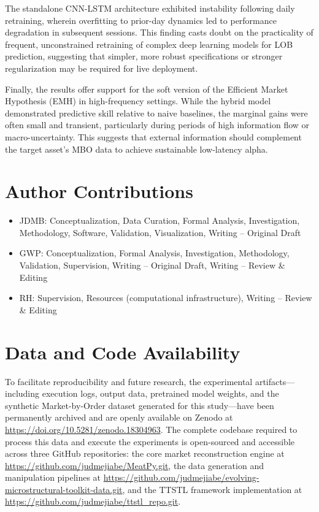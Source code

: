 \documentclass{rQUF2e}
\theoremstyle{plain}
\theoremstyle{definition}
\theoremstyle{remark}
\begin{document}
The standalone CNN-LSTM architecture exhibited instability following daily retraining, wherein overfitting to prior-day dynamics led to performance degradation in subsequent sessions. This finding casts doubt on the practicality of frequent, unconstrained retraining of complex deep learning models for LOB prediction, suggesting that simpler, more robust specifications or stronger regularization may be required for live deployment.

Finally, the results offer support for the soft version of the Efficient Market Hypothesis (EMH) in high-frequency settings. While the hybrid model demonstrated predictive skill relative to naive baselines, the marginal gains were often small and transient, particularly during periods of high information flow or macro-uncertainty. This suggests that external information should complement the target asset's MBO data to achieve sustainable low-latency alpha.



\section*{Author Contributions}

\begin{itemize}
    \item JDMB: Conceptualization, Data Curation, Formal Analysis, Investigation, Methodology, Software, Validation, Visualization, Writing – Original Draft
    \item GWP: Conceptualization, Formal Analysis, Investigation, Methodology, Validation, Supervision, Writing – Original Draft, Writing – Review \& Editing 
    \item RH: Supervision, Resources (computational infrastructure), Writing – Review \& Editing
\end{itemize}

\section*{Data and Code Availability}
To facilitate reproducibility and future research, the experimental artifacts—including execution logs, output data, pretrained model weights, and the synthetic Market-by-Order dataset generated for this study—have been permanently archived and are openly available on Zenodo at \url{https://doi.org/10.5281/zenodo.18304963}. The complete codebase required to process this data and execute the experiments is open-sourced and accessible across three GitHub repositories: the core market reconstruction engine at \url{https://github.com/judmejiabe/MeatPy.git}, the data generation and manipulation pipelines at \url{https://github.com/judmejiabe/evolving-microstructural-toolkit-data.git}, and the TTSTL framework implementation at \url{https://github.com/judmejiabe/ttstl_repo.git}.
\end{document}
